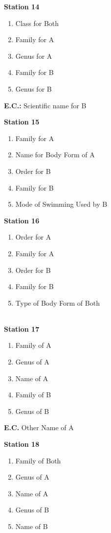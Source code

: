 \textbf{Station 14}

\begin{enumerate}
\def\labelenumi{\arabic{enumi}.}
\setcounter{enumi}{64}
\item
  Class for Both
\item
  Family for A
\item
  Genus for A
\item
  Family for B
\item
  Genus for B
\end{enumerate}

\textbf{E.C.:} Scientific name for B

\textbf{Station 15}

\begin{enumerate}
\def\labelenumi{\arabic{enumi}.}
\setcounter{enumi}{69}
\item
  Family for A
\item
  Name for Body Form of A
\item
  Order for B
\item
  Family for B
\item
  Mode of Swimming Used by B
\end{enumerate}

\textbf{Station 16}

\begin{enumerate}
\def\labelenumi{\arabic{enumi}.}
\setcounter{enumi}{74}
\item
  Order for A
\item
  Family for A
\item
  Order for B
\item
  Family for B
\item
  Type of Body Form of Both
\end{enumerate}

\textbf{\\
Station 17}

\begin{enumerate}
\def\labelenumi{\arabic{enumi}.}
\setcounter{enumi}{79}
\item
  Family of A
\item
  Genus of A
\item
  Name of A
\item
  Family of B
\item
  Genus of B
\end{enumerate}

\textbf{E.C.} Other Name of A

\textbf{Station 18}

\begin{enumerate}
\def\labelenumi{\arabic{enumi}.}
\setcounter{enumi}{84}
\item
  Family of Both
\item
  Genus of A
\item
  Name of A
\item
  Genus of B
\item
  Name of B
\end{enumerate}

